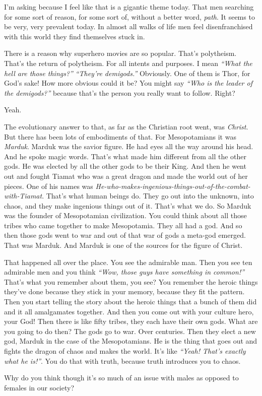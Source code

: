 \documentclass{memoir}
\newcommand{\qq}[1]{\emph{“#1”}}
\begin{document}
\begin{drama}
\jrspeaks I’m asking because I feel like that is a gigantic theme today. That men searching for some sort of reason, for some sort of, without a better word, \emph{path}. It seems to be very, very prevalent today. In almost all walks of life men feel disenfranchised with this world they find themselves stuck in.

\jpspeaks There is a reason why superhero movies are so popular. That’s polytheism. That’s the return of polytheism. For all intents and purposes. I mean \qq{What the hell are those things?} \qq{They’re demigods.} Obviously. One of them is Thor, for God’s sake! How more obvious could it be? You might say \qq{Who is the leader of the demigods?} because that’s the person you really want to follow. Right?

\jrspeaks Yeah.

\jpspeaks The evolutionary answer to that, as far as the Christian root went, was \emph{Christ}. But there has been lots of embodiments of that. For Mesopotamians it was \emph{Marduk}. Marduk was the savior figure. He had eyes all the way around his head. And he spoke magic words. That’s what made him different from all the other gods. He was elected by all the other gods to be their King. And then he went out and fought Tiamat who was a great dragon and made the world out of her pieces. One of his names was \emph{He-who-makes-ingenious-things-out-of-the-combat-with-Tiamat}. That’s what human beings do. They go out into the unknown, into chaos, and they make ingenious things out of it. That’s what we do. So Marduk was the founder of Mesopotamian civilization. You could think about all those tribes who came together to make Mesopotamia. They all had a god. And so then those gods went to war and out of that war of gods a meta-god emerged. That was Marduk. And Marduk is one of the sources for the figure of Christ.

That happened all over the place. You see the admirable man. Then you see ten admirable men and you think \qq{Wow, those guys have something in common!} That’s what you remember about them, you see? You remember the heroic things they’ve done because they stick in your memory, because they fit the pattern. Then you start telling the story about the heroic things that a bunch of them did and it all amalgamates together. And then you come out with your culture hero, your God! Then there is like fifty tribes, they each have their own gods. What are you going to do then? The gods go to war. Over centuries. Then they elect a new god, Marduk in the case of the Mesopotamians. He is the thing that goes out and fights the dragon of chaos and makes the world. It’s like \qq{Yeah! That’s exactly what he is!}. You do that with truth, because truth introduces you to chaos.

\jrspeaks Why do you think though it’s so much of an issue with males as opposed to females in our society?


\end{drama}
\end{document}
